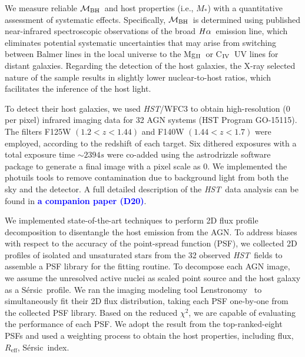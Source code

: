\documentclass[twocolumn,trackchanges]{aastex63}
\newcommand{\hst}{{\it HST}}
\newcommand{\mbh}{$\mathcal M_{\rm BH}$}
\newcommand{\mr}{$Mag_{\rm ~R}$}
\newcommand{\halpha}{${\it H}\alpha$}
\newcommand{\sersic}{S\'ersic}
\newcommand{\lenstronomy}{{\sc Lenstronomy}}
\newcommand{\reff}{{$R_{\mathrm{eff}}$}}
\newcommand{\mstar}{{$M_*$}}
\newcommand{\Mgii}{Mg$_{\rm II}$}
\newcommand{\Civ}{C$_{\rm IV}$}
\newcommand{\blue}[1]{{\textcolor{blue}{\bf #1}}}
\begin{document}
We measure reliable \mbh\ and host properties (i.e., \mstar) with a quantitative assessment of systematic effects. Specifically, \mbh\ is determined using published near-infrared spectroscopic observations of the broad \halpha\ emission line, which eliminates potential systematic uncertainties that may arise from switching between Balmer lines in the local universe to the \Mgii\ or \Civ\ UV lines for distant galaxies. Regarding the detection of the host galaxies, the X-ray selected nature of the sample results in slightly lower nuclear-to-host ratios, which facilitates the inference of the host light. 

To detect their host galaxies, we used \hst/WFC3 to obtain high-resolution (0 per pixel) infrared imaging data for 32 AGN systems (HST Program GO-15115). The filters F125W $(1.2<z<1.44)$ and F140W $(1.44<z<1.7)$ were employed, according to the redshift of each target. Six dithered exposures with a total exposure time $\sim2394s$ were co-added using the {\sc astrodrizzle} software package to generate a final image with a pixel scale as 0. We implemented the {\sc photuils} tools to remove contamination due to background light from both the sky and the detector. A full detailed description of the \hst\ data analysis can be found in \blue{a companion paper (D20)}.

We implemented state-of-the-art techniques to perform 2D flux profile decomposition to disentangle the host emission from the AGN. To address biases with respect to the accuracy of the point-spread function (PSF), we collected 2D profiles of isolated and unsaturated stars from the 32 observed \hst\ fields to assemble a PSF library for the fitting routine. To decompose each AGN image, we assume the unresolved active nuclei as scaled point source and the host galaxy as a \sersic\ profile. We ran the imaging modeling tool \lenstronomy~\citep{lenstronomy} to simultaneously fit their 2D flux distribution, taking each PSF one-by-one from the collected PSF library. Based on the reduced $\chi^2$, we are capable of evaluating the performance of each PSF. We adopt the result from the top-ranked-eight PSFs and used a weighting process to obtain the host properties, including flux, \reff, \sersic\ index.
\end{document}
